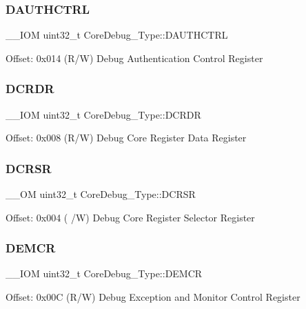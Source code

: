 \subsubsection{\texorpdfstring{DAUTHCTRL}{DAUTHCTRL}}
{\footnotesize\ttfamily \+\_\+\+\_\+\+I\+OM uint32\+\_\+t Core\+Debug\+\_\+\+Type\+::\+D\+A\+U\+T\+H\+C\+T\+RL}

Offset\+: 0x014 (R/W) Debug Authentication Control Register \mbox{\label{struct_core_debug___type_aab3cc92ef07bc1f04b3a3aa6db2c2d55}} 
\subsubsection{\texorpdfstring{DCRDR}{DCRDR}}
{\footnotesize\ttfamily \+\_\+\+\_\+\+I\+OM uint32\+\_\+t Core\+Debug\+\_\+\+Type\+::\+D\+C\+R\+DR}

Offset\+: 0x008 (R/W) Debug Core Register Data Register \mbox{\label{struct_core_debug___type_af907cf64577eaf927dac6787df6dd98b}} 
\subsubsection{\texorpdfstring{DCRSR}{DCRSR}}
{\footnotesize\ttfamily \+\_\+\+\_\+\+OM uint32\+\_\+t Core\+Debug\+\_\+\+Type\+::\+D\+C\+R\+SR}

Offset\+: 0x004 ( /W) Debug Core Register Selector Register \mbox{\label{struct_core_debug___type_aeb3126abc4c258a858f21f356c0df6ee}} 
\subsubsection{\texorpdfstring{DEMCR}{DEMCR}}
{\footnotesize\ttfamily \+\_\+\+\_\+\+I\+OM uint32\+\_\+t Core\+Debug\+\_\+\+Type\+::\+D\+E\+M\+CR}

Offset\+: 0x00C (R/W) Debug Exception and Monitor Control Register \mbox{\label{struct_core_debug___type_ad63554e4650da91a8e79929cbb63db66}} 
